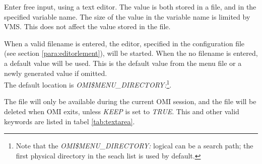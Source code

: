 \documentclass[a4paper]{book}
\newcommand{\vs}{\vspace{3mm}}
\begin{document}
Enter free input, using a text editor. The value is both stored in a file, 
and in the specified variable name. The size of the value in the variable 
name is limited by VMS. This does not affect the value stored in the file.

\vs

When a valid filename is entered, the editor, specified in the configuration 
file (see section \ref{para:editorlement}), will be started. When 
the no filename is entered, a default value will be used. This is the 
default value from the menu file or a newly generated value if omitted. \\
The default location is \textsl{OMI{\$}MENU{\_}DIRECTORY:}\footnote{ Note that the
\textsl{OMI{\$}MENU{\_}DIRECTORY:} logical can be a search path; the first physical
directory in the seach list is used by default.}\label{fnote:slist}.
\setcounter{slist}{\value{footnote}}

\vs

The file will only be available during the current OMI session, and the file 
will be deleted when OMI exits, unless \textsl{KEEP} is set to \textsl{TRUE}.
This and other valid keywords are listed in tabel \ref{tab:textarea}.
\end{document}
